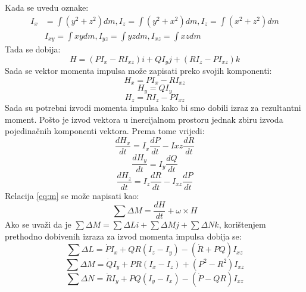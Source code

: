    Kada se uvedu oznake:
    \begin{equation}
        \begin{split}           
        I_x&=\int (y^2+z^2)dm, I_z=\int (y^2+x^2)dm,I_z=\int (x^2+z^2)dm\\
        &I_{xy}=\int xydm, I_{yz}=\int yzdm,I_{xz}=\int xzdm 
    \end{split}
    \end{equation}
Tada se dobija:
\begin{equation}
    H=(PI_x-RI_{xz})i+QI_yj+(RI_z-PI_{xz})k
\end{equation}
Sada se vektor momenta impulsa može zapisati preko svojih komponenti:
\begin{equation}
    H_x=PI_x-RI_{xz}
\end{equation}
\begin{equation}
    H_y=QI_y
\end{equation}
\begin{equation}
    H_z=RI_z-PI_{xz}
\end{equation}
Sada su potrebni izvodi momenta impulsa kako bi smo dobili izraz za rezultantni moment.
Pošto je izvod vektora u inercijalnom prostoru jednak zbiru izvoda pojedinačnih komponenti vektora. Prema tome 
vrijedi:
\begin{equation}
    \frac{dH_x}{dt}=I_x\frac{dP}{dt}-I{xz}\frac{dR}{dt}
\end{equation}
\begin{equation}
    \frac{dH_y}{dt}=I_y\frac{dQ}{dt}
\end{equation}
\begin{equation}
    \frac{dH_z}{dt}=I_z\frac{dR}{dt}-I_{xz}\frac{dP}{dt}
\end{equation}
Relacija \ref{eq:m} se može napisati kao:
\begin{equation}
    \sum \Delta M=\frac{dH}{dt}+\omega \times H
\end{equation}
Ako se uvaži da je $\sum \Delta M=\sum \Delta Li + \sum \Delta Mj+\sum \Delta Nk$, korištenjem prethodno dobivenih 
izraza za izvod momenta impulsa dobija se:
\begin{equation}
    \sum \Delta L=\dot{P}I_x+QR(I_z-I_y)-(\dot{R}+PQ)I_{xz}
\end{equation}
\begin{equation}
    \sum \Delta M=\dot{Q}I_y+PR(I_x-I_z)+(P^2-R^2)I_{xz}
\end{equation}
\begin{equation}
    \sum \Delta N=\dot{R}I_y+PQ(I_y-I_x)-(\dot{P}-QR)I_{xz}
\end{equation}
